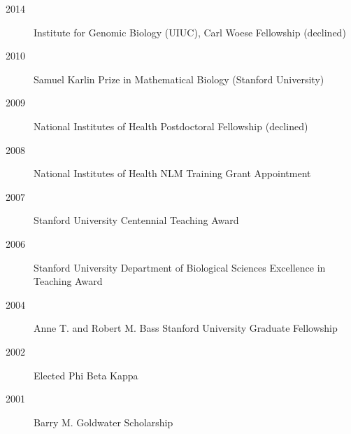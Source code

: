 \documentclass[11pt]{article}
\begin{document}
  \begin{description}
  \item[2014] Institute for Genomic Biology (UIUC), Carl Woese Fellowship (declined)
  \item[2010] Samuel Karlin Prize in Mathematical Biology (Stanford University) 
  \item[2009] National Institutes of Health Postdoctoral Fellowship (declined)
  \item[2008] National Institutes of Health NLM Training Grant Appointment
  \item[2007] Stanford University Centennial Teaching Award
  \item[2006] Stanford University Department of Biological Sciences Excellence in Teaching Award
  \item[2004] Anne T. and Robert M. Bass Stanford University Graduate Fellowship
  \item[2002] Elected Phi Beta Kappa
  \item[2001] Barry M. Goldwater Scholarship
  \end{description}
\end{document}
